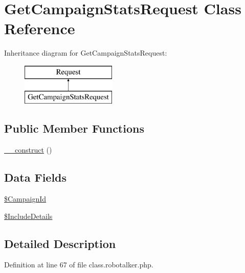 \hypertarget{class_get_campaign_stats_request}{\section{Get\-Campaign\-Stats\-Request Class Reference}
\label{class_get_campaign_stats_request}
}
Inheritance diagram for Get\-Campaign\-Stats\-Request\-:\begin{figure}[H]
\begin{center}
\leavevmode
\includegraphics[height=2.000000cm]{class_get_campaign_stats_request}
\end{center}
\end{figure}
\subsection*{Public Member Functions}
\begin{DoxyCompactItemize}
\item 
\hyperlink{class_get_campaign_stats_request_a095c5d389db211932136b53f25f39685}{\-\_\-\-\_\-construct} ()
\end{DoxyCompactItemize}
\subsection*{Data Fields}
\begin{DoxyCompactItemize}
\item 
\hyperlink{class_get_campaign_stats_request_a2d22a3b5dcd66a7b8cc5db60947b5ca3}{\$\-Campaign\-Id}
\item 
\hyperlink{class_get_campaign_stats_request_a6a7dc0605d9a2e10066aeb57b77fc272}{\$\-Include\-Details}
\end{DoxyCompactItemize}


\subsection{Detailed Description}


Definition at line 67 of file class.\-robotalker.\-php.



